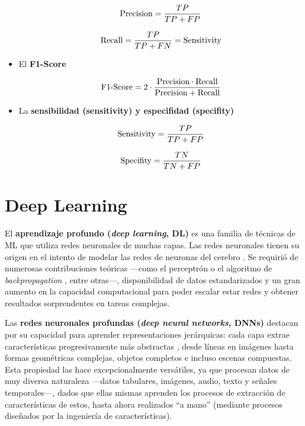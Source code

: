 \begin{itemize}
    $$
    \textnormal{Precision} = \frac{TP}{TP+FP}
    $$

    $$
    \textnormal{Recall} = \frac{TP}{TP+FN} = \textnormal{Sensitivity}
    $$
    

    \item El \textbf{F1-Score} 

    $$
    \textnormal{F1-Score} = 2 \cdot \frac{\textnormal{Precision} \cdot \textnormal{Recall}}{\textnormal{Precision} + \textnormal{Recall}}
    $$


    \item La \textbf{sensibilidad (sensitivity) y especifidad (specifity)}

    $$
    \textnormal{Sensitivity} = \frac{TP}{TP+FP}
    $$

    $$
    \textnormal{Specifity} = \frac{TN}{TN+FP}
    $$


\end{itemize}




\section{Deep Learning}

El \textbf{aprendizaje profundo (\textit{deep learning}, DL)} es una familia de técnicas de ML que utiliza
redes neuronales de muchas capas. 
Las redes neuronales tienen su origen en el intento de modelar las redes de neuronas del cerebro 
\cite{mcculloch1943}. Se requirió de numerosas contribuciones teóricas ---como el perceptrón \cite{rosenblatt1958} 
o el algoritmo de \textit{backpropagation} \cite{rumelhart1986,werbos1994}, entre otras---, disponibilidad de datos 
estandarizados y un gran aumento en la capacidad computacional para poder escalar estar redes y obtener resultados 
sorprendentes en tareas complejas.

Las \textbf{redes neuronales profundas (\textit{deep neural networks}, DNNs)} destacan por su capacidad para 
aprender representaciones jerárquicas: cada capa extrae características progresivamente más abstractas 
\cite{lecun2015}, desde líneas en imágenes hasta formas geométricas complejas, objetos completos e incluso 
escenas compuestas.
Esta propiedad las hace excepcionalmente versátiles, ya que procesan datos de muy diversa naturaleza ---datos 
tabulares, imágenes, audio, texto y señales temporales---, dados que ellas mismas aprenden los procesos de 
extracción de características de estos, hasta ahora realizados ``a mano'' (mediante procesos diseñados por la 
ingeniería de características).

